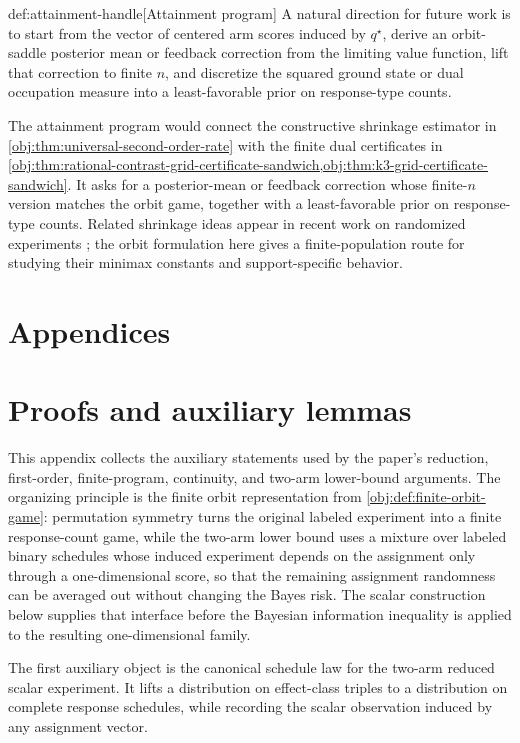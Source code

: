 \documentclass[11pt]{article}
\begin{document}
\begin{remarkv}{def:attainment-handle}[Attainment program]
A natural direction for future work is to start from the vector of centered arm scores induced by \(q^\star\), derive an orbit-saddle posterior mean or feedback correction from the limiting value function, lift that correction to finite \(n\), and discretize the squared ground state or dual occupation measure into a least-favorable prior on response-type counts.
\end{remarkv}

The attainment program would connect the constructive shrinkage estimator in \cref{obj:thm:universal-second-order-rate} with the finite dual certificates in \cref{obj:thm:rational-contrast-grid-certificate-sandwich,obj:thm:k3-grid-certificate-sandwich}. It asks for a posterior-mean or feedback correction whose finite-\(n\) version matches the orbit game, together with a least-favorable prior on response-type counts. Related shrinkage ideas appear in recent work on randomized experiments \citep{rosenman_hunter_2026_shrinkage}; the orbit formulation here gives a finite-population route for studying their minimax constants and support-specific behavior.


\appendix

\section*{Appendices}

\section{Proofs and auxiliary lemmas}\label{sec:appendix-lemmas}

This appendix collects the auxiliary statements used by the paper's reduction, first-order, finite-program, continuity, and two-arm lower-bound arguments. The organizing principle is the finite orbit representation from \cref{obj:def:finite-orbit-game}: permutation symmetry turns the original labeled experiment into a finite response-count game, while the two-arm lower bound uses a mixture over labeled binary schedules whose induced experiment depends on the assignment only through a one-dimensional score, so that the remaining assignment randomness can be averaged out without changing the Bayes risk. The scalar construction below supplies that interface before the Bayesian information inequality is applied to the resulting one-dimensional family.

The first auxiliary object is the canonical schedule law for the two-arm reduced scalar experiment. It lifts a distribution on effect-class triples to a distribution on complete response schedules, while recording the scalar observation induced by any assignment vector.
\end{document}
